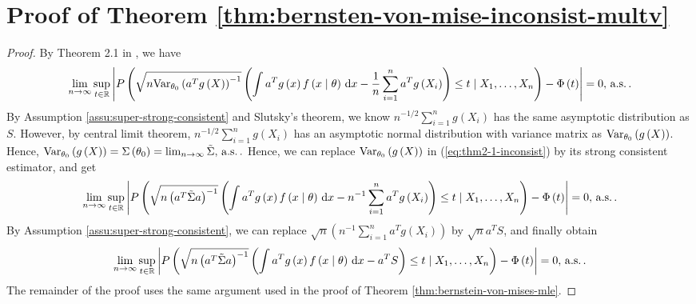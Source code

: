 \section{\label{sec:Proof-of-Theorem-3}Proof of Theorem \ref{thm:bernsten-von-mise-inconsist-multv}}
\begin{proof}
By Theorem 2.1 in \citet{rivoirard2012bernstein}, we have 
\begin{equation}
\lim_{n\rightarrow\infty}\sup_{t\in\mathbb{R}}\left|P\left(\sqrt{n\mathrm{Var}_{\theta_{0}}\left(a^{T}g\left(X\right)\right)^{-1}}\left(\int a^{T}g\left(x\right)f\left(x\mid\theta\right)\,\mathrm{d} x-\frac{1}{n}\sum_{i=1}^{n}a^{T}g\left(X_{i}\right)\right)\le t\mid X_{1},\ldots,X_{n}\right)-\Phi\left(t\right)\right|=0,\,\mathrm{a.s.}\,.\label{eq:thm2-1-inconsist}
\end{equation}
By Assumption \ref{assu:super-strong-consistent} and Slutsky's theorem,
we know $n^{-1/2}\sum_{i=1}^{n}g\left(X_{i}\right)$ has the same
asymptotic distribution as $S$. However, by central limit theorem,
$n^{-1/2}\sum_{i=1}^{n}g\left(X_{i}\right)$ has an asymptotic normal
distribution with variance matrix as $\mathrm{Var}_{\theta_{0}}\left(g\left(X\right)\right)$.
Hence, $\mathrm{Var}_{\theta_{0}}\left(g\left(X\right)\right)=\Sigma\left(\theta_{0}\right)=\lim_{n\rightarrow\infty}\tilde{\Sigma},\,\mathrm{a.s.}\,.$
Hence, we can replace $\mathrm{Var}_{\theta_{0}}\left(g\left(X\right)\right)$
in (\ref{eq:thm2-1-inconsist}) by its strong consistent estimator,
and get
\[
\lim_{n\rightarrow\infty}\sup_{t\in\mathbb{R}}\left|P\left(\sqrt{n\left(a^{T}\tilde{\Sigma}a\right)^{-1}}\left(\int a^{T}g\left(x\right)f\left(x\mid\theta\right)\,\mathrm{d} x-n^{-1}\sum_{i=1}^{n}a^{T}g\left(X_{i}\right)\right)\le t\mid X_{1},\ldots,X_{n}\right)-\Phi\left(t\right)\right|=0,\,\mathrm{a.s.}\,.
\]
By Assumption \ref{assu:super-strong-consistent}, we can replace
$\sqrt{n}\left(n^{-1}\sum_{i=1}^{n}a^{T}g\left(X_{i}\right)\right)$
by $\sqrt{n}a^{T}S$, and finally obtain
\[
\lim_{n\rightarrow\infty}\sup_{t\in\mathbb{R}}\left|P\left(\sqrt{n\left(a^{T}\tilde{\Sigma}a\right)^{-1}}\left(\int a^{T}g\left(x\right)f\left(x\mid\theta\right)\,\mathrm{d} x-a^{T}S\right)\le t\mid X_{1},\ldots,X_{n}\right)-\Phi\left(t\right)\right|=0,\,\mathrm{a.s.}\,.
\]
The remainder of the proof uses the same argument used in the proof
of Theorem \ref{thm:bernstein-von-mises-mle}. 
\end{proof}
